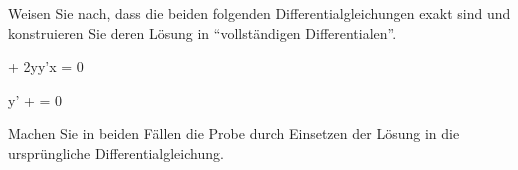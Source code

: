 \begin{atiTask}[
	title = Zwei exakte Differentialgleichungen
]
	Weisen Sie nach, dass die beiden folgenden Differentialgleichungen exakt sind und konstruieren Sie deren Lösung in \enquote{vollständigen Differentialen}.
	\begin{atiSubequations}
		\item{
			 + 2yy'\ln x = 0
		}
		\item{
			y' +  = 0
		}
	\end{atiSubequations}
	Machen Sie in beiden Fällen die Probe durch Einsetzen der Lösung in die ursprüngliche Differentialgleichung.
\end{atiTask}